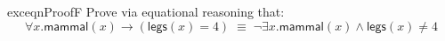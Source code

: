 \vspace{-1em}

\begin{restatable}{exc}{eqnProofF}
  Prove via equational reasoning that:
  \vspace{-0.25em}
\begin{equation*}
  \forall x . \mathsf{mammal}(x) \rightarrow (\mathsf{legs}(x) = 4) \;
  \equiv \; \neg \exists x . \mathsf{mammal}(x) \wedge
  \mathsf{legs}(x)
  \neq 4
\end{equation*}
\end{restatable}
\vspace{-1em}
